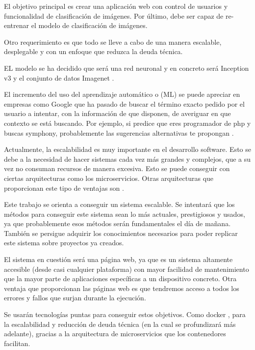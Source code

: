 
El objetivo principal es crear una aplicación web con control de usuarios y funcionalidad de clasificación de imágenes. Por último, debe ser capaz de re-entrenar el modelo de clasificación de imágenes.

Otro requerimiento es que todo se lleve a cabo de una manera escalable, desplegable y con un enfoque que reduzca la deuda técnica.

EL modelo se ha decidido que será una red neuronal y en concreto será Inception v3 \cite{incep} y el conjunto de datos Imagenet \cite{imnet}.

El incremento del uso del aprendizaje automático o  (ML) se puede apreciar en empresas como Google que ha pasado de buscar el término exacto pedido por el usuario a intentar, con la información de que disponen, de averiguar en que contexto se está buscando. Por ejemplo, si predice que eres programador de php y buscas symphony, probablemente las sugerencias alternativas te propongan .

Actualmente, la escalabilidad es muy importante en el desarrollo software. Esto se debe a la necesidad de hacer sistemas cada vez más grandes y complejos, que a su vez no consuman recursos de manera excesiva. Esto se puede conseguir con ciertas arquitecturas como los microservicios. Otras arquitecturas que proporcionan este tipo de ventajas son  \cite{svlops, svless}.

Este trabajo se orienta a conseguir un sistema escalable. Se intentará que los métodos para conseguir este sistema sean lo más actuales, prestigiosos y usados, ya que probablemente esos métodos serán fundamentales el día de mañana. También se persigue adquirir los conocimientos necesarios para poder replicar este sistema sobre proyectos ya creados.

El sistema en cuestión será una página web, ya que es un sistema altamente accesible (desde casi cualquier plataforma) con mayor facilidad de mantenimiento que la mayor parte de aplicaciones específicas a un dispositivo concreto. Otra ventaja que proporcionan las páginas web es que tendremos acceso a todos los errores y fallos que surjan durante la ejecución.

Se usarán tecnologías puntas para conseguir estos objetivos. Como docker \cite{dock}, para la escalabilidad y reducción de deuda técnica (en la cual se profundizará más adelante), gracias a la arquitectura de microservicios que los contenedores facilitan.

